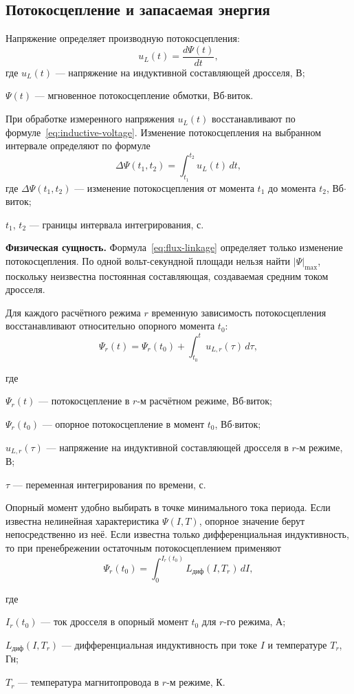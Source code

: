 \documentclass[14pt,a4paper]{extarticle}
\newcommand{\phys}{\par\noindent\textbf{Физическая сущность.} }
\newenvironment{whereblock}
 {\par\noindent где\par
  \begin{list}{}{\setlength{\leftmargin}{12.5mm}
                  \setlength{\itemindent}{-12.5mm}
                  \setlength{\itemsep}{0pt}
                  \setlength{\parsep}{0pt}
                  \setlength{\topsep}{0pt}}}
 {\end{list}}
\newcommand{\whereitem}[2]{\item[] #1 --- #2}
\begin{document}
\subsection{Потокосцепление и запасаемая энергия}
\label{subsec:flux-linkage-energy}

Напряжение определяет производную потокосцепления:
\begin{equation}
 u_L(t)=\frac{d\Psi(t)}{dt},
 \label{eq:flux-linkage-voltage}
\end{equation}
где $u_L(t)$ --- напряжение на индуктивной составляющей дросселя, В;
\par\noindent
$\Psi(t)$ --- мгновенное потокосцепление обмотки, Вб$\cdot$виток.

При обработке измеренного напряжения $u_L(t)$ восстанавливают по
формуле~\eqref{eq:inductive-voltage}. Изменение потокосцепления на выбранном
интервале определяют по формуле
\begin{equation}
 \Delta\Psi(t_1,t_2)=\int_{t_1}^{t_2}u_L(t)\,dt,
 \label{eq:flux-linkage}
\end{equation}
где $\Delta\Psi(t_1,t_2)$ --- изменение потокосцепления от момента $t_1$
до момента $t_2$, Вб$\cdot$виток;
\par\noindent
$t_1$, $t_2$ --- границы интервала интегрирования, с.

\phys Формула~\eqref{eq:flux-linkage} определяет только изменение
потокосцепления. По одной вольт-секундной площади нельзя найти
$\left|\Psi\right|_{\max}$, поскольку неизвестна постоянная составляющая,
создаваемая средним током дросселя.

Для каждого расчётного режима $r$ временную зависимость потокосцепления
восстанавливают относительно опорного момента $t_0$:
\begin{equation}
 \Psi_r(t)=\Psi_r(t_0)+
 \int_{t_0}^{t}u_{L,r}(\tau)\,d\tau,
 \label{eq:flux-linkage-trajectory}
\end{equation}
\begin{whereblock}
\whereitem{$\Psi_r(t)$}{потокосцепление в $r$-м расчётном режиме,
Вб$\cdot$виток;}
\whereitem{$\Psi_r(t_0)$}{опорное потокосцепление в момент $t_0$,
Вб$\cdot$виток;}
\whereitem{$u_{L,r}(\tau)$}{напряжение на индуктивной составляющей
дросселя в $r$-м режиме, В;}
\whereitem{$\tau$}{переменная интегрирования по времени, с.}
\end{whereblock}

Опорный момент удобно выбирать в точке минимального тока периода. Если
известна нелинейная характеристика $\Psi(I,T)$, опорное значение берут
непосредственно из неё. Если известна только дифференциальная индуктивность,
то при пренебрежении остаточным потокосцеплением применяют
\begin{equation}
 \Psi_r(t_0)=
 \int_{0}^{I_r(t_0)}
 L_{\text{диф}}(I,T_r)\,dI,
 \label{eq:flux-linkage-reference}
\end{equation}
\begin{whereblock}
\whereitem{$I_r(t_0)$}{ток дросселя в опорный момент $t_0$ для $r$-го
режима, А;}
\whereitem{$L_{\text{диф}}(I,T_r)$}{дифференциальная индуктивность при токе
$I$ и температуре $T_r$, Гн;}
\whereitem{$T_r$}{температура магнитопровода в $r$-м режиме, К.}
\end{whereblock}
\end{document}
